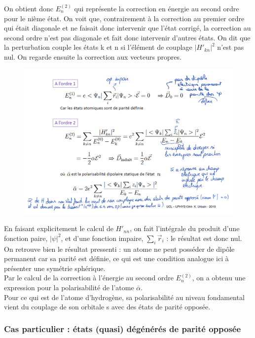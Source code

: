 On obtient donc $E_n^{(2)}$ qui représente la correction en énergie au second ordre pour le nième état. On voit que, contrairement à la correction au premier ordre qui était diagonale et ne faisait donc intervenir que l'état corrigé, la correction au second ordre n'est pas diagonale et fait donc intervenir d'autres états. On dit que la perturbation couple les états k et n si l'élément de couplage $|H'_{kn}|^2$ n'est pas nul. On regarde ensuite la correction aux vecteurs propres.\\

\begin{figure}[tph]
    \centering
    \includegraphics[scale=0.65]{Images2/ordre2.2.PNG}
\end{figure}

En faisant explicitement le calcul de $H'_{nn}$, on fait l'intégrale du produit d'une fonction paire, $|\psi|^2$, et d'une fonction impaire, $\sum_i \vec{r}_i$ : le résultat est donc nul. On retrouve bien le résultat pressenti : un atome ne peut posséder de dipôle permanent car sa parité est définie, ce qui est une condition analogue ici à présenter une symétrie sphérique.\\

Par le calcul de la correction à l'énergie au second ordre $E_n^{(2)}$, on a obtenu une expression pour la polarisabilité de l'atome $\bar{\alpha}$.\\
Pour ce qui est de l'atome d'hydrogène, sa polarisabilité au niveau fondamental vient du couplage de son orbitale s avec des états de parité opposée.



    \subsubsection{Cas particulier : états (quasi) dégénérés de parité opposée}



